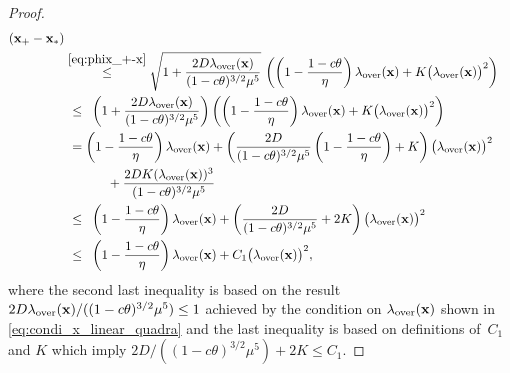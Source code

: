 \documentclass[11pt]{article}
\theoremstyle{plain}
\theoremstyle{definition}
\theoremstyle{remark}
\theoremstyle{plain}
\def\vx{{\bf{x}}}
\def\vx {{{\bf x}}}
\def\x{{\bf x}}
\begin{document}
\begin{proof}
\begin{align*}
{(\x_{+}-\x_*)}\\
&\overset{\eqref{eq:phix_+-x}}{\leq}
\sqrt{1+\frac{2D\lambda_{\mathrm{over}}(\x)}{(1-c\theta)^{3/2}\mu^5}}\,\left(\left(1-\frac{1-c\theta}{\eta}\right)\lambda_{\mathrm{over}}(\x)
+ K\bigl(\lambda_{\mathrm{over}}(\x)\bigr)^2\right)\\
&~\leq\,~\left(1+\frac{2D\lambda_{\mathrm{over}}(\x)}{(1-c\theta)^{3/2}\mu^5}\right)
\left(\left(1-\frac{1-c\theta}{\eta}\right)\lambda_{\mathrm{over}}(\x)
+K\bigl(\lambda_{\mathrm{over}}(\x)\bigr)^2\right)\\
&~=\left(1-\frac{1-c\theta}{\eta}\right)\lambda_{\mathrm{over}}(\x) + \left(\frac{2D}{(1-c\theta)^{3/2}\mu^5}\left(1-\frac{1-c\theta}{\eta}\right)+K\right)
\bigl(\lambda_{\mathrm{over}}(\x)\bigr)^2 \\
&~~~~~~~~~~+ \frac{2DK(\lambda_{\mathrm{over}}(\vx))^{3}}{(1-c\theta)^{3/2}\mu^5}
\\
&~\leq\,~\left(1-\frac{1-c\theta}{\eta}\right)\lambda_{\mathrm{over}}(\x)
+\left(\frac{2D}{(1-c\theta)^{3/2}\mu^5}+2K\right)
\bigl(\lambda_{\mathrm{over}}(\x)\bigr)^2\\
&~\leq\,~\left(1-\frac{1-c\theta}{\eta}\right)\lambda_{\mathrm{over}}(\x)
+C_1\bigl(\lambda_{\mathrm{over}}(\x)\bigr)^2,
\end{align*}
where the second last inequality is based on the result $2D\lambda_{\mathrm{over}}(\vx)/((1-c\theta)^{3/2}\mu^5)\leq 1$ achieved by the condition on $\lambda_{\mathrm{over}}(\x)$ shown in \eqref{eq:condi_x_linear_quadra}
and the last inequality is based on definitions of~$C_1$ and $K$ which imply $2D/((1-c\theta)^{3/2}\mu^5)+2K\leq C_1$.
\end{proof}
\end{document}
